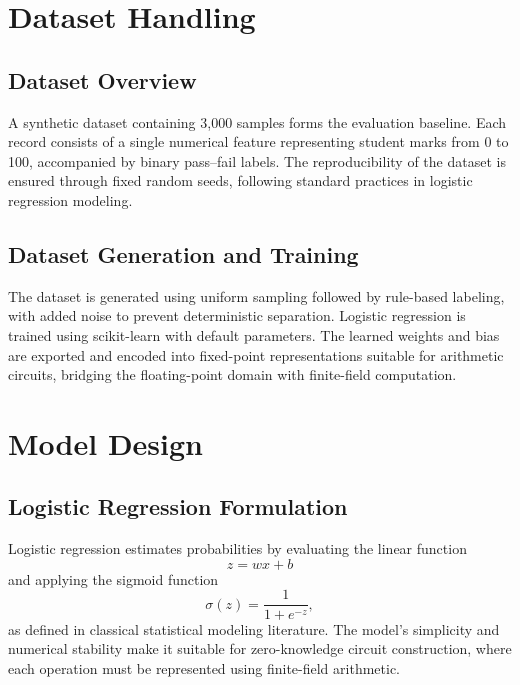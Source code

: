 \section{Dataset Handling}

\subsection{Dataset Overview}

A synthetic dataset containing 3,000 samples forms the evaluation baseline. Each record consists of a single numerical feature representing student marks from 0 to 100, accompanied by binary pass–fail labels. The reproducibility of the dataset is ensured through fixed random seeds, following standard practices in logistic regression modeling.

\subsection{Dataset Generation and Training}

The dataset is generated using uniform sampling followed by rule-based labeling, with added noise to prevent deterministic separation. Logistic regression is trained using scikit-learn with default parameters. The learned weights and bias are exported and encoded into fixed-point representations suitable for arithmetic circuits, bridging the floating-point domain with finite-field computation.

\section{Model Design}

\subsection{Logistic Regression Formulation}

Logistic regression estimates probabilities by evaluating the linear function
\begin{equation}
    z = wx + b
\end{equation}
and applying the sigmoid function
\begin{equation}
    \sigma(z) = \frac{1}{1 + e^{-z}},
\end{equation}
as defined in classical statistical modeling literature. The model’s simplicity and numerical stability make it suitable for zero-knowledge circuit construction, where each operation must be represented using finite-field arithmetic.

